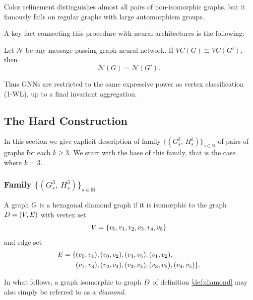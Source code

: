 Color refinement distinguishes almost all pairs of non-isomorphic graphs, but it famously fails on regular graphs with large automorphism groups.

A key fact connecting this procedure with neural architectures is the following:

\begin{proposition}
\label{prop:gnn-wl}
Let $\mathcal{N}$ be any message-passing graph neural network. If $VC(G) \cong VC(G')$, then
\[
\mathcal{N}(G) = \mathcal{N}(G').
\]
\end{proposition}

\noindent
Thus GNNs are restricted to the same expressive power as vertex classification (1-WL), up to a final invariant aggregation.

\subsection{The Hard Construction}

In this section we give explicit description of family $\{(G_s^k,\, H_s^k)\}_{s \in \mathbb{N}}$ of pairs of graphs for each $k \geq 3$. We start with the base of this family, that is the case where $k = 3$.

\subsubsection{Family $\{(G_s^3,\, H_s^3)\}_{s \in \mathbb{N}}$}

\begin{definition}\label{def:diamond}
    A graph $G$ is a hexagonal diamond graph if it is isomorphic to the graph
    $D = (V,E)$ with vertex set
    \[
        V = \{v_0,v_1,v_2,v_3,v_4,v_5\}
    \]
    and edge set
    \[
    \begin{aligned}
        E = \{&(v_0,v_1), (v_0,v_2), (v_3,v_5), (v_1,v_2), \\
        &(v_1,v_3),(v_2,v_4),(v_3,v_4), (v_3,v_5), (v_4,v_5) \}.
    \end{aligned}
    \]

\end{definition}

In what follows, a graph isomorphic to graph $D$ of definition \ref{def:diamond} may also simply be referred to as a \emph{diamond}.

